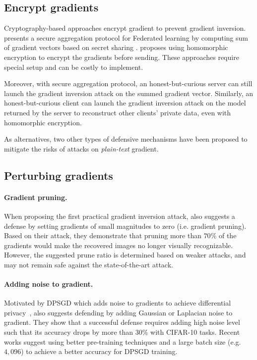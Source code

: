 \subsection{Encrypt gradients}

Cryptography-based approaches encrypt gradient to prevent gradient inversion. \citep{bonawitz2016practical} presents a secure aggregation protocol for Federated learning by computing sum of gradient vectors based on secret sharing \citep{shamir1979share}. \citep{phong18} proposes using homomorphic encryption to encrypt the gradients before sending. These approaches require special setup and can be costly to implement. 


Moreover, with secure aggregation protocol, an honest-but-curious server can still launch the gradient inversion attack on the summed gradient vector. Similarly, an honest-but-curious client can launch the gradient inversion attack on the model returned by the server to reconstruct other clients' private data, even with homomorphic encryption.

As alternatives, two other types of defensive mechanisms have been proposed to mitigate the risks of attacks on \textit{plain-text} gradient.


\subsection{Perturbing gradients}

\paragraph{Gradient pruning.} When proposing the first practical gradient inversion attack, \citep{zhu2020deep} also suggests a defense by setting gradients of small magnitudes to zero (i.e. gradient pruning). Based on their attack, they demonstrate that pruning more than $70\%$ of the gradients would make the recovered images no longer visually recognizable. However, the suggested prune ratio is determined based on weaker attacks, and may not remain safe against the state-of-the-art attack.

\paragraph{Adding noise to gradient.} Motivated by DPSGD \citep{abadi2016deep} which adds noise to gradients to achieve differential privacy~\citep{d09, dr14}, \citep{zhu2020deep, wei2020framework} also suggests defending by adding Gaussian or Laplacian noise to gradient. They show that a successful defense requires adding high noise level such that its accuracy drops by more than $30\%$ with CIFAR-10 tasks. Recent works \citep{papernot2020making, tramer2020differentially} suggest using better pre-training techniques and a large batch size (e.g. $4,096$) to achieve a better accuracy for DPSGD training. 


